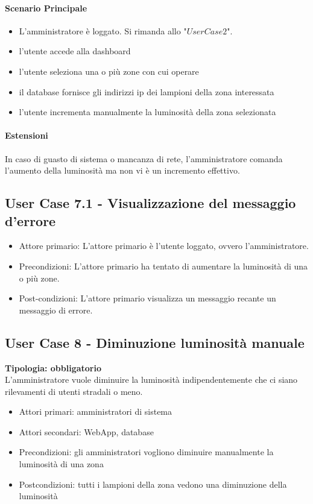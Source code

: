 \documentclass[12pt]{article}
\begin{document}
\paragraph{Scenario Principale}
\begin{itemize}
	\item L'amministratore è loggato. Si rimanda allo "$User Case 2$".
	\item l'utente accede alla dashboard
	\item l'utente seleziona una o più zone con cui operare
	\item il database fornisce gli indirizzi ip dei lampioni della zona interessata
	\item l'utente incrementa manualmente la luminosità della zona selezionata
\end{itemize}

\paragraph{Estensioni} In caso di guasto di sistema o mancanza di rete, l'amministratore comanda l'aumento della luminosità ma non vi è un incremento effettivo.

\subsection{User Case 7.1 - Visualizzazione del messaggio d'errore}
\begin{itemize}
	\item Attore primario: L'attore primario è l'utente loggato, ovvero l'amministratore.
	\item Precondizioni: L'attore primario ha tentato di aumentare la luminosità di una o più zone.
	\item Post-condizioni: L'attore primario visualizza un messaggio recante un messaggio di errore.
\end{itemize}

\subsection{User Case 8 - Diminuzione luminosità manuale}
\textbf{Tipologia: obbligatorio} \\
L'amministratore vuole diminuire la luminosità indipendentemente che ci siano rilevamenti di utenti stradali o meno.
\begin{itemize}
	\item Attori primari: amministratori di sistema
	\item Attori secondari: WebApp, database
	\item Precondizioni: gli amministratori vogliono diminuire manualmente la luminosità di una zona
	\item Postcondizioni: tutti i lampioni della zona vedono una diminuzione della luminosità
\end{itemize}
\end{document}
